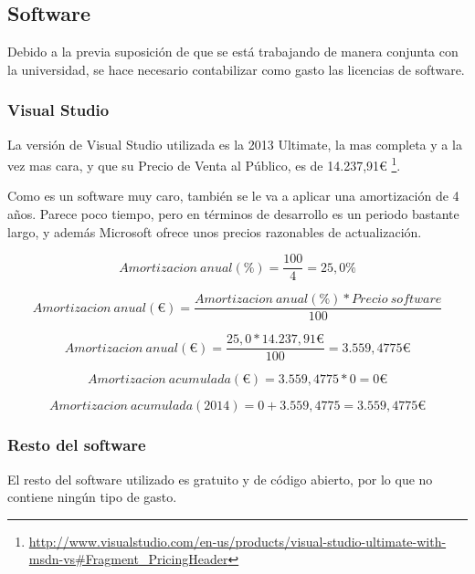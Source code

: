 \subsection{Software}
Debido a la previa suposici\'on de que se est\'a trabajando de manera conjunta con la 
universidad, se hace necesario contabilizar como gasto las licencias de software.

\subsubsection{Visual Studio}
La versi\'on de Visual Studio utilizada es la 2013 Ultimate, la mas completa y a la vez mas
cara, y que su Precio de Venta al P\'ublico, es de 14.237,91€ \footnote{\url{http://www.visualstudio.com/en-us/products/visual-studio-ultimate-with-msdn-vs\#Fragment_PricingHeader}}.

Como es un software muy caro, tambi\'en se le va a aplicar una amortizaci\'on de 4 a\~nos.
Parece poco tiempo, pero en t\'erminos de desarrollo es un periodo bastante largo, y adem\'as
Microsoft ofrece unos precios razonables de actualizaci\'on.

\begin{center}
\begin{equation}
Amortizacion \ anual (\%) = \frac{100}{4} = 25,0 \%
\end{equation}

\begin{equation}
Amortizacion \ anual (€) = \frac{Amortizacion \ anual(\%) * Precio \ software}{100}
\end{equation}

\begin{equation}
Amortizacion \ anual (€) = \frac{25,0 * 14.237,91 €}{100} = 3.559,4775 €
\end{equation}

\begin{equation}
Amortizacion \ acumulada (€) = 3.559,4775 * 0 = 0 €
\end{equation}

\begin{equation}
Amortizacion \ acumulada (2014) = 0 + 3.559,4775 = 3.559,4775 €
\end{equation} 
\end{center} 

\subsubsection{Resto del software}
El resto del software utilizado es gratuito y de c\'odigo abierto, por lo que no contiene
ning\'un tipo de gasto.

